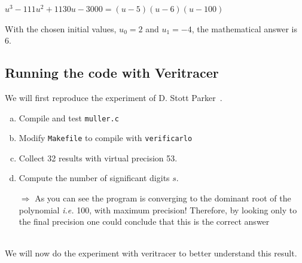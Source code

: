 \documentclass{TP}
\begin{document}
\quad $u^3 - 111u^2 + 1130u - 3000 = (u-5)(u-6)(u-100)$

With the chosen initial values, $u_0=2$ and $u_1=-4$, the mathematical answer is 6.

\subsection{Running the code with Veritracer}

We will first reproduce the experiment of D. Stott Parker~\cite{parker1997monte}.

\begin{question}
    \begin{enumerate}[(a)]
\item Compile and test {\tt muller.c}
\item Modify {\tt Makefile} to compile with {\tt verificarlo}
\item Collect 32 results with virtual precision 53.
\item Compute the number of significant digits $s$.

$\Rightarrow$ As you can see the program is converging to the dominant root of the polynomial {\it i.e.} 100, with maximum precision! Therefore, by looking only to the final precision one could conclude that this is the correct answer\\~\\

\end{enumerate}
\end{question}

We will now do the experiment with veritracer to better understand this result.
\end{document}
